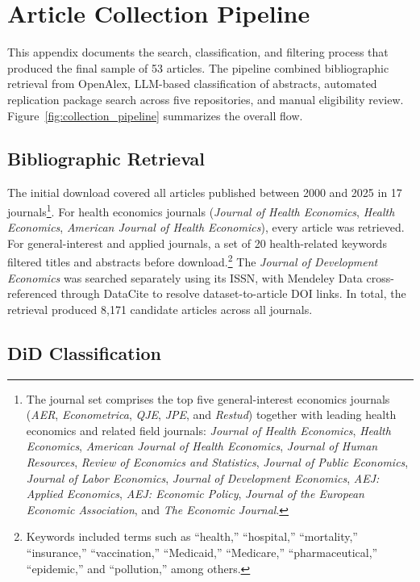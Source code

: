 \chapter{Article Collection Pipeline}
\label{AppendixD}

This appendix documents the search, classification, and filtering process that produced the final sample of 53 articles. The pipeline combined bibliographic retrieval from OpenAlex, LLM-based classification of abstracts, automated replication package search across five repositories, and manual eligibility review. Figure~\ref{fig:collection_pipeline} summarizes the overall flow.

\section{Bibliographic Retrieval}

The initial download covered all articles published between 2000 and 2025 in 17 journals\footnote{The journal set comprises the top five general-interest economics journals (\emph{AER}, \emph{Econometrica}, \emph{QJE}, \emph{JPE}, and \emph{Restud}) together with leading health economics and related field journals: \emph{Journal of Health Economics}, \emph{Health Economics}, \emph{American Journal of Health Economics}, \emph{Journal of Human Resources}, \emph{Review of Economics and Statistics}, \emph{Journal of Public Economics}, \emph{Journal of Labor Economics}, \emph{Journal of Development Economics}, \emph{AEJ: Applied Economics}, \emph{AEJ: Economic Policy}, \emph{Journal of the European Economic Association}, and \emph{The Economic Journal}.}. For health economics journals (\emph{Journal of Health Economics}, \emph{Health Economics}, \emph{American Journal of Health Economics}), every article was retrieved. For general-interest and applied journals, a set of 20 health-related keywords filtered titles and abstracts before download.\footnote{Keywords included terms such as ``health,'' ``hospital,'' ``mortality,'' ``insurance,'' ``vaccination,'' ``Medicaid,'' ``Medicare,'' ``pharmaceutical,'' ``epidemic,'' and ``pollution,'' among others.} The \emph{Journal of Development Economics} was searched separately using its ISSN, with Mendeley Data cross-referenced through DataCite to resolve dataset-to-article DOI links. In total, the retrieval produced 8,171 candidate articles across all journals.

\section{DiD Classification}


